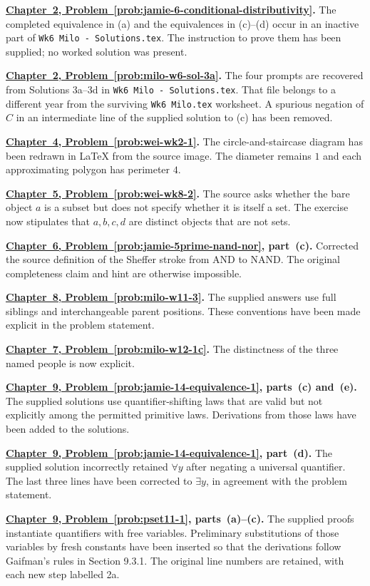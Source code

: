 \documentclass[11pt,letterpaper,oneside,openany]{book}
\newcounter{problem}[chapter]
\newcommand{\problemref}[2]{\hyperref[prob:#2]{Chapter~#1, Problem~\ref*{prob:#2}}}
\begin{document}
\textbf{\problemref{2}{jamie-6-conditional-distributivity}.} The completed equivalence in (a) and the equivalences in (c)--(d) occur in an inactive part of \texttt{Wk6 Milo - Solutions.tex}. The instruction to prove them has been supplied; no worked solution was present.

\textbf{\problemref{2}{milo-w6-sol-3a}.} The four prompts are recovered from Solutions 3a--3d in \texttt{Wk6 Milo - Solutions.tex}. That file belongs to a different year from the surviving \texttt{Wk6 Milo.tex} worksheet. A spurious negation of $C$ in an intermediate line of the supplied solution to (c) has been removed.

\textbf{\problemref{4}{wei-wk2-1}.} The circle-and-staircase diagram has been redrawn in LaTeX from the source image. The diameter remains $1$ and each approximating polygon has perimeter $4$.

\textbf{\problemref{5}{wei-wk8-2}.} The source asks whether the bare object $a$ is a subset but does not specify whether it is itself a set. The exercise now stipulates that $a,b,c,d$ are distinct objects that are not sets.

\textbf{\problemref{6}{jamie-5prime-nand-nor}, part~(c).} Corrected the source definition of the Sheffer stroke from AND to NAND. The original completeness claim and hint are otherwise impossible.

\textbf{\problemref{8}{milo-w11-3}.} The supplied answers use full siblings and interchangeable parent positions. These conventions have been made explicit in the problem statement.

\textbf{\problemref{7}{milo-w12-1c}.} The distinctness of the three named people is now explicit.

\textbf{\problemref{9}{jamie-14-equivalence-1}, parts~(c) and~(e).} The supplied solutions use quantifier-shifting laws that are valid but not explicitly among the permitted primitive laws. Derivations from those laws have been added to the solutions.

\textbf{\problemref{9}{jamie-14-equivalence-1}, part~(d).} The supplied solution incorrectly retained $\forall y$ after negating a universal quantifier. The last three lines have been corrected to $\exists y$, in agreement with the problem statement.

\textbf{\problemref{9}{pset11-1}, parts~(a)--(c).} The supplied proofs instantiate quantifiers with free variables. Preliminary substitutions of those variables by fresh constants have been inserted so that the derivations follow Gaifman's rules in Section 9.3.1. The original line numbers are retained, with each new step labelled 2a.
\end{document}
